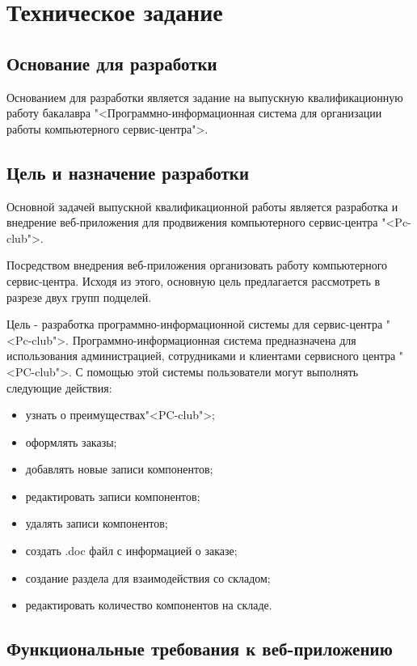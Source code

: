 \section{Техническое задание}
\subsection{Основание для разработки}

Основанием для разработки является задание на выпускную квалификационную работу бакалавра "<Программно-информационная система для  организации работы  компьютерного сервис-центра">.

\subsection{Цель и назначение разработки}

Основной задачей выпускной квалификационной работы является разработка и внедрение веб-приложения для продвижения компьютерного сервис-центра "<Pc-club">.

Посредством внедрения веб-приложения организовать работу компьютерного сервис-центра. Исходя из этого, основную цель предлагается рассмотреть в разрезе двух групп подцелей.

Цель - разработка программно-информационной системы для сервис-центра "<Pc-club">.
Программно-информационная система предназначена для использования администрацией,  сотрудниками и  клиентами сервисного центра "<PC-club">. 
С помощью этой системы пользователи могут выполнять следующие действия:
\begin{itemize}
\item узнать о преимуществах"<PC-club">;
\item оформлять заказы;
\item добавлять новые записи компонентов;
\item редактировать записи компонентов;
\item удалять записи компонентов;
\item создать .doc файл с информацией о заказе;
\item создание раздела для взаимодействия со складом;
\item редактировать количество компонентов на складе.
\end{itemize}

\subsection{ Функциональные требования к веб-приложению}

